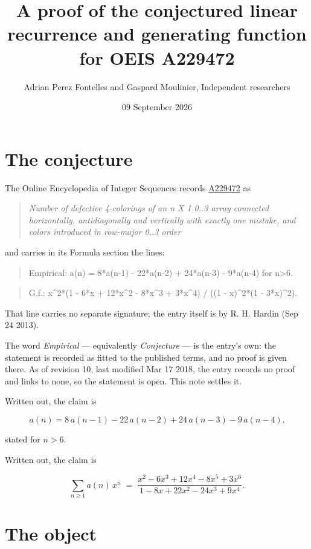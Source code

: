 \documentclass[11pt]{article}
\title{A proof of the conjectured linear recurrence and generating function for OEIS A229472}
\author{Adrian Perez Fontelles and Gaspard Moulinier, Independent researchers}
\date{09 September 2026}
\theoremstyle{definition}
\begin{document}
\maketitle
\section{The conjecture}

The Online Encyclopedia of Integer Sequences records \href{https://oeis.org/A229472}{A229472} as

\begin{quote}\itshape Number of defective 4-colorings of an n X 1 0..3 array connected horizontally, antidiagonally and vertically with exactly one mistake, and colors introduced in row-major 0..3 order\end{quote}

and carries in its Formula section the lines:

\begin{quote}\ttfamily Empirical: a(n) = 8*a(n-1) - 22*a(n-2) + 24*a(n-3) - 9*a(n-4) for n>6.\end{quote}

\begin{quote}\ttfamily G.f.: x\textasciicircum{}2*(1 - 6*x + 12*x\textasciicircum{}2 - 8*x\textasciicircum{}3 + 3*x\textasciicircum{}4) / ((1 - x)\textasciicircum{}2*(1 - 3*x)\textasciicircum{}2).\end{quote}

That line carries no separate signature; the entry itself is by R. H. Hardin (Sep 24 2013).

The word {\itshape Empirical} --- equivalently {\itshape Conjecture} --- is the entry's own: the statement is recorded as fitted to the published terms, and no proof is given there. As of revision 10, last modified Mar 17 2018, the entry records no proof and links to none, so the statement is open. This note settles it.

Written out, the claim is

\[a(n) = 8\,a(n-1) - 22\,a(n-2) + 24\,a(n-3) - 9\,a(n-4).\]

stated for $n > 6$.

Written out, the claim is

\[\sum_{n \ge 1} a(n)\,x^n \;=\; \frac{x^{2} - 6x^{3} + 12x^{4} - 8x^{5} + 3x^{6}}{1 - 8x + 22x^{2} - 24x^{3} + 9x^{4}}.\]

\section{The object}
\end{document}
